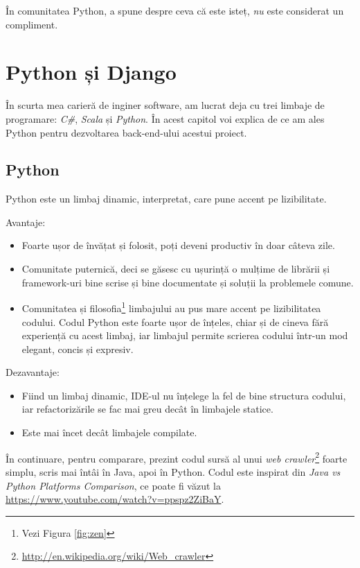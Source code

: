 \begin{savequote}[75mm]
În comunitatea Python, a spune despre ceva că este isteț, \emph{nu} este considerat un compliment.
\end{savequote}

\chapter{Python și Django}

În scurta mea carieră de inginer software, am lucrat deja cu trei limbaje de programare:
\emph{C\#}, \emph{Scala} și \emph{Python}. În acest capitol voi explica de ce am
ales Python pentru dezvoltarea back-end-ului acestui proiect.

\section{Python}

Python este un limbaj dinamic, interpretat, care pune accent pe lizibilitate.

Avantaje:
\begin{itemize}
\item Foarte ușor de învățat și folosit, poți deveni productiv în doar câteva zile.
\item Comunitate puternică, deci se găsesc cu ușurință o mulțime de librării și framework-uri bine scrise și bine documentate și soluții la problemele comune.
\item Comunitatea și filosofia\footnote{Vezi Figura \ref{fig:zen}} limbajului au pus mare accent pe lizibilitatea codului.
Codul Python este foarte ușor de înțeles, chiar și de cineva fără experiență
cu acest limbaj, iar limbajul permite scrierea codului într-un mod elegant, concis și expresiv.
\end{itemize}

Dezavantaje:
\begin{itemize}
\item Fiind un limbaj dinamic, IDE-ul nu înțelege la fel de bine structura codului, iar refactorizările se fac mai greu decât în limbajele statice.
\item Este mai încet decât limbajele compilate.
\end{itemize}

În continuare, pentru comparare, prezint codul sursă al unui \emph{web crawler}\footnote{\url{http://en.wikipedia.org/wiki/Web\_crawler}}
foarte simplu, scris mai întâi în Java, apoi în Python. Codul este inspirat
din \emph{Java vs Python Platforms Comparison}, ce poate fi văzut la \url{https://www.youtube.com/watch?v=ppspz2ZiBaY}.

